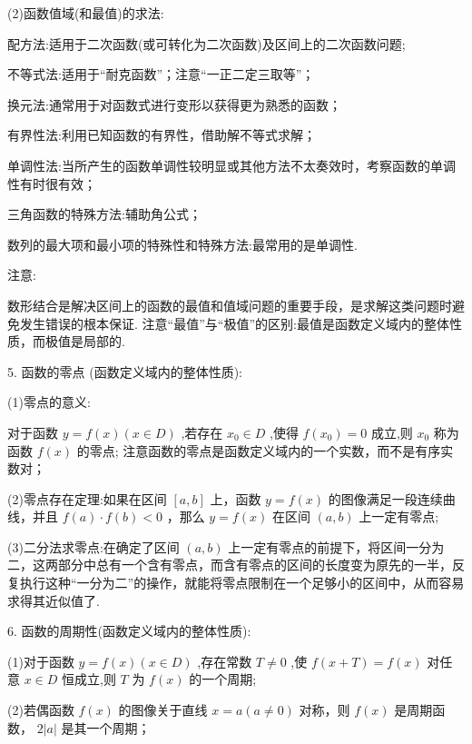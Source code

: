 (2)函数值域(和最值)的求法:

  配方法:适用于二次函数(或可转化为二次函数)及区间上的二次函数问题;

  不等式法:适用于“耐克函数”；注意“一正二定三取等”；

  换元法:通常用于对函数式进行变形以获得更为熟悉的函数；

  有界性法:利用已知函数的有界性，借助解不等式求解；

  单调性法:当所产生的函数单调性较明显或其他方法不太奏效时，考察函数的单调性有时很有效；

  三角函数的特殊方法:辅助角公式；

  数列的最大项和最小项的特殊性和特殊方法:最常用的是单调性.

注意:

  数形结合是解决区间上的函数的最值和值域问题的重要手段，是求解这类问题时避免发生错误的根本保证.    注意“最值”与“极值”的区别:最值是函数定义域内的整体性质，而极值是局部的.

5. 函数的零点 (函数定义域内的整体性质):

(1)零点的意义:

对于函数 $y = f\left( x\right) \left( {x \in  D}\right)$ ,若存在 ${x}_{0} \in  D$ ,使得 $f\left( {x}_{0}\right)  = 0$ 成立,则 ${x}_{0}$ 称为函数 $f\left( x\right)$ 的零点; 注意函数的零点是函数定义域内的一个实数，而不是有序实数对；

(2)零点存在定理:如果在区间 $\left\lbrack  {a,b}\right\rbrack$ 上，函数 $y = f\left( x\right)$ 的图像满足一段连续曲线，并且 $f\left( a\right)  \cdot  f\left( b\right)  < 0$ ，那么 $y = f\left( x\right)$ 在区间 $\left( {a,b}\right)$ 上一定有零点;

(3)二分法求零点:在确定了区间 $\left( {a,b}\right)$ 上一定有零点的前提下，将区间一分为二，这两部分中总有一个含有零点，而含有零点的区间的长度变为原先的一半，反复执行这种“一分为二”的操作，就能将零点限制在一个足够小的区间中，从而容易求得其近似值了.

6. 函数的周期性(函数定义域内的整体性质):

(1)对于函数 $y = f\left( x\right) \left( {x \in  D}\right)$ ,存在常数 $T \neq  0$ ,使 $f\left( {x + T}\right)  = f\left( x\right)$ 对任意 $x \in  D$ 恒成立,则 $T$ 为 $f\left( x\right)$ 的一个周期;

(2)若偶函数 $f\left( x\right)$ 的图像关于直线 $x = a\left( {a \neq  0}\right)$ 对称，则 $f\left( x\right)$ 是周期函数， $2\left| a\right|$ 是其一个周期；

